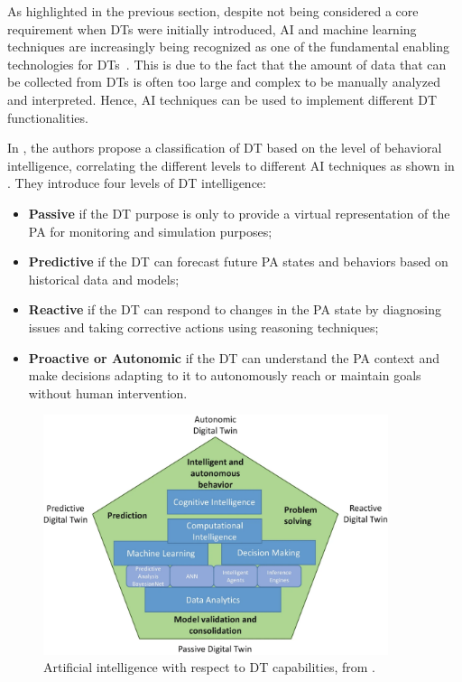 As highlighted in the previous section, 
despite not being considered a core requirement when \acp{DT} were initially introduced,
\ac{AI} and machine learning techniques are increasingly being recognized as one of the fundamental enabling technologies for \acp{DT}~\cite{Kreuzer_Papapetrou_Zdravkovic_2024}.
%
This is due to the fact that the amount of data that can be collected from \acp{DT} is often too large and complex to be manually analyzed and interpreted. 
%
Hence, \ac{AI} techniques can be used to implement different \ac{DT} functionalities. 

In \cite{Minerva_Crespi_Farahbakhsh_Awan_2023}, the authors propose a classification of \ac{DT} based on the level of behavioral intelligence, correlating the different levels to different \ac{AI} techniques as shown in .
%
They introduce four levels of \ac{DT} intelligence: 
\begin{itemize}
    \item \textbf{Passive} if the \ac{DT} purpose is only to provide a virtual representation of the \ac{PA} for monitoring and simulation purposes;
    \item \textbf{Predictive} if the \ac{DT} can forecast future \ac{PA} states and behaviors based on historical data and models;
    \item \textbf{Reactive} if the \ac{DT} can respond to changes in the \ac{PA} state by diagnosing issues and taking corrective actions using reasoning techniques;
    \item \textbf{Proactive or Autonomic} if the \ac{DT} can understand the \ac{PA} context and make decisions adapting to it to autonomously reach or maintain goals without human intervention.
\end{itemize}

\begin{figure}[ht]
    \centering
    \includegraphics[width=0.9\textwidth]{figures/AI_DT_pentagon.pdf}
    \caption{Artificial intelligence with respect to \ac{DT} capabilities, from \cite{Minerva_Crespi_Farahbakhsh_Awan_2023}.}
    \label{fig:ai-dt-pentagon}
\end{figure}

